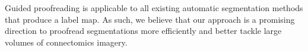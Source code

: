 Guided proofreading is applicable to all existing automatic segmentation methods that
produce a label map. As such, we believe that our approach is a promising
direction to proofread segmentations more efficiently and better tackle large
volumes of connectomics imagery.

%
%
%
